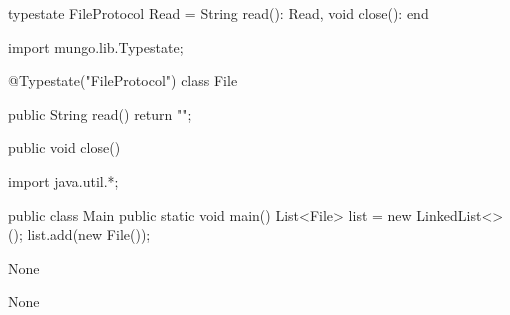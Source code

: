 \begin{code}
typestate FileProtocol {
  Read = {
    String read(): Read,
    void close(): end
  }
}\end{code}

\begin{code}
import mungo.lib.Typestate;

@Typestate("FileProtocol")
class File {

  public String read() {
    return "";
  }

  public void close() {
  }

}\end{code}

\begin{code}
import java.util.*;

public class Main {
  public static void main() {
    List<File> list = new LinkedList<>();
    list.add(new File());
  }
}\end{code}

\lstset{language=,caption=Original Mungo output}
\begin{code}
None
\end{code}

\lstset{language=,caption=New Mungo output}
\begin{code}
None
\end{code}

